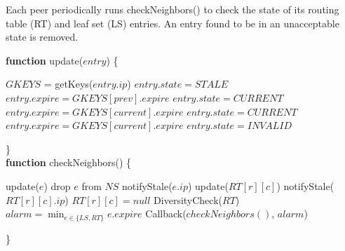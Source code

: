 \begin{algorithm} \label{alg:check_neighbors}
\caption{Each peer periodically runs checkNeighbors() to check the state of its routing table (RT) and 
leaf set (LS) entries. An entry found to be in an unacceptable state is removed.}
\textbf{function} update($entry$) \{
\begin{algorithmic}[1]
\STATE $GKEYS$ = getKeys($entry.ip$)
\STATE $entry.state   = STALE$
\STATE $entry.expire = GKEYS[prev].expire$
\STATE $entry.state   = CURRENT$
\STATE $entry.expire = GKEYS[current].expire$
\STATE $entry.state   = CURRENT$
\STATE $entry.expire = GKEYS[current].expire$
\ELSE
\STATE $entry.state = INVALID$
\ENDIF
\end{algorithmic}
\}\\

\textbf{function} checkNeighbors() \{
\begin{algorithmic}[1]
		\STATE update($e$)
			\STATE drop $e$ from $NS$
			\STATE notifyStale($e.ip$)
		\ENDIF
	\ENDIF
\ENDFOR
\STATE
{}
			\STATE update($RT[r][c]$)
				\STATE notifyStale($RT[r][c].ip$)
				\STATE $RT[r][c] = null$
			\ENDIF
		\ENDIF
	\ENDFOR
\ENDFOR
\STATE DiversityCheck($RT$)
\STATE $alarm = \min_{e \in \{LS, RT\}} e.expire$
\STATE Callback($checkNeighbors()$, $alarm$)
\end{algorithmic}
\}\\
\end{algorithm}



